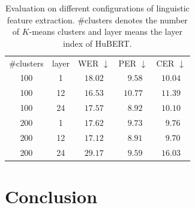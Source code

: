 \documentclass[letterpaper]{article} %
\begin{document}
\begin{table}
\centering
{
\begin{tabular}{ccccc}
\toprule
\#clusters
&layer   &WER $\downarrow$  &PER $\downarrow$ &CER $\downarrow$    \\  \cmidrule(lr){1-5}

100  &1       &$18.02$ &$~~9.58$  &$10.04$     \\
100  &12 &$\mathbf{16.53}$ & $10.77$ & $11.39$ \\
100  &24 &$17.57$ &$~~8.92$ &$10.10$ \\ \cmidrule(lr){1-5}
200  &1  &$17.62$ &$~~9.73$ &$~~9.76$ \\
200  &12 &$17.12$ &$~~\mathbf{8.91}$ &$~~\mathbf{9.70}$ \\
200  &24 &$29.17$ &$~~9.59$ &$16.03$  \\
\bottomrule
\end{tabular}
}
\caption{Evaluation on different configurations of linguistic feature extraction. \#clusters denotes the number of $K$-means clusters and layer means the layer index of HuBERT.}
\label{table:SSL}
\end{table}

\begin{table}
\centering
{}
\caption{CMOS, WER, and CER results of an ablation study.}
\label{table:ablation}
\end{table}


\vspace{-3.00mm}
\section{Conclusion}
\end{document}
